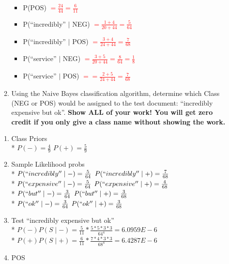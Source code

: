 \documentclass[11pt]{article}
\begin{document}
\begin{enumerate}
\begin{enumerate}
\begin{itemize}
\item  P(POS)
\textcolor{red}{$=\frac{24}{44}=\frac{6}{11}$}

\item P(``incredibly'' $\mid$ NEG)
\textcolor{red}{$=\frac{1+4}{20+44}= \frac{5}{64}$}

\item P(``incredibly'' $\mid$ POS)
\textcolor{red}{$=\frac{3+4}{24+44}= \frac{7}{68}$}

\item P(``service'' $\mid$ NEG)
\textcolor{red}{$=\frac{3+5}{20+44}= \frac{8}{64}= \frac{1}{8}$}

\item P(``service'' $\mid$ POS)
\textcolor{red}{$==\frac{2+5}{24+44}= \frac{7}{68}$}
\end{itemize}

\hspace*{.2in}
\item Using the Naive Bayes classification algorithm, determine which
  Class (NEG or POS) would be
assigned to the test document: ``incredibly expensive but ok''. 
{\bf Show ALL of your work! You will get zero credit if you only give
  a class name without showing the work.}


\end{enumerate}
\begin {enumerate}
  \color{red}
  \item[] Class Priors
   \\* \quad $P(-)=\frac{4}{9}$ \quad $P(+)=\frac{5}{9}$
   \item[] Sample Likelihood probs
   \\* \quad $P(``incredibly'' \mid-)=\frac{5}{64}$ \quad $P(``incredibly'' \mid+)=\frac{7}{68}$
   \\* \quad $P(``expensive'' \mid-)=\frac{5}{64}$ \quad $P(``expensive'' \mid+)=\frac{4}{68}$
   \\* \quad $P(``but'' \mid-)=\frac{3}{64}$ \quad \quad\quad \quad $P(``but'' \mid+)=\frac{3}{68}$
   \\* \quad $P(``ok'' \mid-)=\frac{3}{64}$ \quad \quad  \quad\quad$P(``ok'' \mid+)=\frac{3}{68}$
  \item[] Test ``incredibly expensive but ok''
  \\* \quad $P(-)P(S\mid-)= \frac{5}{11}* \frac{5*5*3*3}{64^4}=6.0959E-6$
  \\* \quad $P(+)P(S\mid+)= \frac{6}{11}* \frac{7*4*3*3}{68^4}=6.4287E-6$
  \item [] POS
\end{enumerate}


\end{enumerate}
\end{document}
